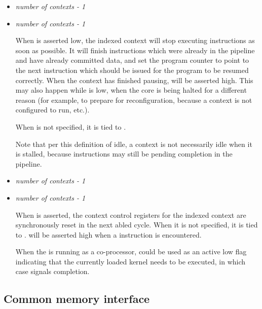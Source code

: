 \documentclass[main.tex]{subfiles}
\begin{document}
\begin{itemize}
  \vspace{1em}
  \item {}\textit{number of contexts - 1}
  \item {}\textit{number of contexts - 1}
  
  When  is asserted low, the indexed context will stop executing instructions as soon as possible. It will finish instructions which were already in the pipeline and have already committed data, and set the program counter to point to the next instruction which should be issued for the program to be resumed correctly. When the context has finished pausing,  will be asserted high. This may also happen while  is low, when the core is being halted for a different reason (for example, to prepare for reconfiguration, because a context is not configured to run, etc.).
  
  When  is not specified, it is tied to .
  
  Note that per this definition of idle, a context is not necessarily idle when it is stalled, because instructions may still be pending completion in the pipeline.
  
  \vspace{1em}
  \item {}\textit{number of contexts - 1}
  \item {}\textit{number of contexts - 1}
  
  When  is asserted, the context control registers for the indexed context are synchronously reset in the next abled cycle. When it is not specified, it is tied to .  will be asserted high when a  instruction is encountered.
  
  When the \rvex{} is running as a co-processor,  could be used as an active low flag indicating that the currently loaded kernel needs to be executed, in which case  signals completion.
  
\end{itemize}

\subsection{Common memory interface}
\end{document}
